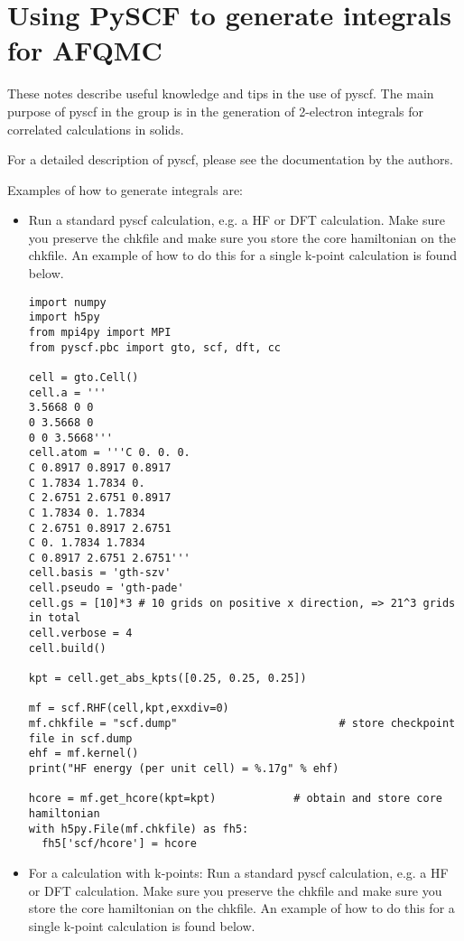 \section{Using PySCF to generate integrals for AFQMC}
\label{sec:pyscf}
These notes describe useful knowledge and tips in the use of pyscf. 
The main purpose of pyscf in the group is in the generation of 2-electron integrals for correlated calculations in solids.

For a detailed description of pyscf, please see the documentation by the authors.

Examples of how to generate integrals are:
\begin{itemize}
\item Run a standard pyscf calculation, e.g. a HF or DFT calculation. Make sure you preserve the chkfile and make sure you store the core hamiltonian on the chkfile. An example of how to do this for a single k-point calculation is found below.
\begin{lstlisting}[style=Python,caption=The following is an example PySCF input file for single k-point calculations.]
import numpy
import h5py
from mpi4py import MPI
from pyscf.pbc import gto, scf, dft, cc

cell = gto.Cell()
cell.a = '''
3.5668 0 0
0 3.5668 0
0 0 3.5668'''
cell.atom = '''C 0. 0. 0. 
C 0.8917 0.8917 0.8917
C 1.7834 1.7834 0. 
C 2.6751 2.6751 0.8917
C 1.7834 0. 1.7834
C 2.6751 0.8917 2.6751
C 0. 1.7834 1.7834
C 0.8917 2.6751 2.6751'''
cell.basis = 'gth-szv'
cell.pseudo = 'gth-pade'
cell.gs = [10]*3 # 10 grids on positive x direction, => 21^3 grids in total
cell.verbose = 4
cell.build()

kpt = cell.get_abs_kpts([0.25, 0.25, 0.25])  

mf = scf.RHF(cell,kpt,exxdiv=0)
mf.chkfile = "scf.dump"                         # store checkpoint file in scf.dump
ehf = mf.kernel()
print("HF energy (per unit cell) = %.17g" % ehf)

hcore = mf.get_hcore(kpt=kpt)            # obtain and store core hamiltonian
with h5py.File(mf.chkfile) as fh5:
  fh5['scf/hcore'] = hcore
\end{lstlisting}

\item {For a calculation with k-points:
Run a standard pyscf calculation, e.g. a HF or DFT calculation. Make sure you preserve the chkfile and make sure you store the core hamiltonian on the chkfile. An example of how to do this for a single k-point calculation is found below.}


\end{itemize}
